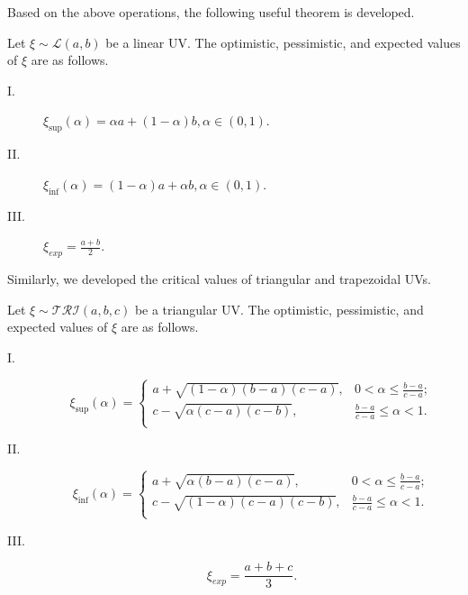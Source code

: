 \par Based on the above operations, the following useful theorem is developed.
\begin{theorem}\cite{Liu 2015}\label{thm.3}
	Let $\xi\sim \mathcal{L}(a,b)$ be a linear UV. The optimistic, pessimistic, and expected values of $\xi$ are as follows.
	\begin{description}
		\item[ I.]  $\xi_{\sup}(\alpha)=\alpha a+(1-\alpha)b,\alpha\in (0,1).$
		\item[ II.]  $\xi_{\inf}(\alpha)=(1-\alpha)a+\alpha b,\alpha\in (0,1).$
		\item[ III.]  $\xi_{exp}=\frac{a+b}{2}.$
	\end{description} 
\end{theorem}
\par Similarly, we developed the critical values of triangular and trapezoidal UVs.
\begin{theorem}\label{thm.4}
	Let $\xi\sim \mathcal{TRI}(a,b,c)$ be a triangular UV. The optimistic, pessimistic, and expected values of $\xi$ are as follows.
	\begin{description}
		\item[ I.]  
		\[\xi_{\sup}(\alpha)=\left\{
		\begin{array}{ll}
			a+\sqrt{(1-\alpha)(b-a)(c-a)}, & 0<\alpha\leq \frac{b-a}{c-a};\\
			c-\sqrt{\alpha(c-a)(c-b)}, &  \frac{b-a}{c-a}\leq\alpha<1.\\
		\end{array}
		\right.
		\]
		\item[ II.]  \[\xi_{\inf}(\alpha)=\left\{
		\begin{array}{ll}
			a+\sqrt{\alpha(b-a)(c-a)}, & 0<\alpha\leq \frac{b-a}{c-a};\\
			c-\sqrt{(1-\alpha)(c-a)(c-b)}, &  \frac{b-a}{c-a}\leq\alpha<1.\\
		\end{array}
		\right.
		\]
		\item[ III.]  $$\xi_{exp}=\frac{a+b+c}{3}.$$
	\end{description} 
\end{theorem}
